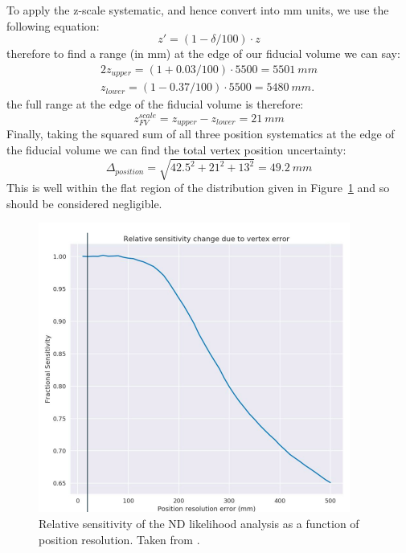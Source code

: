 \documentclass[]{article}
\begin{document}
To apply the z-scale systematic, and hence convert into mm units, we use the following equation:
\begin{equation}
z' = (1 - \delta / 100)\cdot z
\end{equation}
therefore to find a range (in mm) at the edge of our fiducial volume we can say:
\begin{alignat}{2}
z_{upper} = (1 + 0.03/100)\cdot 5500 = 5501~mm \\
z_{lower} = (1 - 0.37/100)\cdot 5500 = 5480~mm.
\end{alignat}
the full range at the edge of the fiducial volume is therefore:
\begin{equation}
z^{scale}_{FV} = z_{upper} - z_{lower} = 21~mm
\end{equation}
Finally, taking the squared sum of all three position systematics at the edge of the fiducial volume we can find the total vertex position uncertainty:
\begin{equation}
\Delta_{position} = \sqrt{42.5^2 +  21^2 + 13^2} = 49.2~mm
\end{equation}
This is well within the flat region of the distribution given in Figure~\ref{fig:position} and so should be considered negligible.

\begin{figure}
	\centering
	\includegraphics[scale=0.8]{plots/Position} 
	\caption{Relative sensitivity of the ND likelihood analysis as a function of position resolution. Taken from \cite{MorganTalk}.}
	\label{fig:position}
\end{figure}
\end{document}
